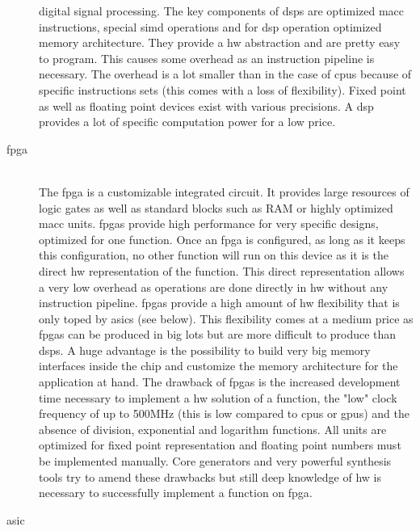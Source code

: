 \documentclass[mscthesis]{usiinfthesis}
\begin{document}
\begin{description}
        digital signal processing. The key components of \glspl{dsp} are
        optimized \gls{macc} instructions, special \gls{simd}
        operations and for \gls{dsp} operation optimized memory architecture.
        They provide a \gls{hw} abstraction and are pretty easy to program.
        This causes some overhead as an instruction pipeline is necessary. The
        overhead is a lot smaller than in the case of \glspl{cpu} because of
        specific instructions sets (this comes with a loss of flexibility).
        Fixed point as well as floating point devices exist with various
        precisions. A \gls{dsp} provides a lot of specific computation power
        for a low price.
    \item[\acrshort{fpga}] \hfill \\
        The \acrfull{fpga} is a customizable integrated circuit. It provides
        large resources of logic gates as well as standard blocks such as RAM
        or highly optimized \gls{macc} units. \glspl{fpga} provide
        high performance for very specific designs, optimized for one function.
        Once an \gls{fpga} is configured, as long as it keeps this
        configuration, no other function will run on this device as it is the
        direct \gls{hw} representation of the function. This direct
        representation allows a very low overhead as operations are done
        directly in \gls{hw} without any instruction pipeline. \glspl{fpga}
        provide a high amount of \gls{hw} flexibility that is only toped by
        \glspl{asic} (see below). This flexibility comes at a medium price as
        \glspl{fpga} can be produced in big lots but are more difficult to
        produce than \glspl{dsp}. A huge advantage is the possibility to
        build very big memory interfaces inside the chip and customize the
        memory architecture for the application at hand. The drawback of
        \glspl{fpga} is the increased development time necessary to implement
        a \gls{hw} solution of a function, the "low" clock frequency of up to
        500MHz (this is low compared to \glspl{cpu} or \glspl{gpu}) and the
        absence of division, exponential and logarithm functions. All units are
        optimized for fixed point representation and floating point numbers
        must be implemented manually. Core generators and very powerful
        synthesis tools try to amend these drawbacks but still deep
        knowledge of \gls{hw} is necessary to successfully implement a function
        on \gls{fpga}.
    \item[\acrshort{asic}] \hfill \\

\end{description}
\end{document}
